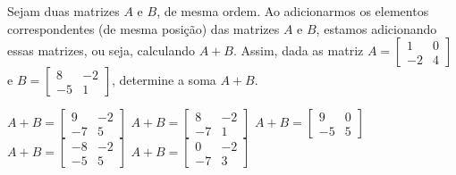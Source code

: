 Sejam duas matrizes $A$ e $B$, de mesma ordem. Ao adicionarmos os elementos correspondentes (de mesma posição) das matrizes $A$ e $B$, estamos adicionando essas matrizes, ou seja, calculando $A+B$. Assim, dada as matriz $A = \left[ \begin{array}{cc}
1 & 0 \\
-2 & 4
\end{array} \right]$ e $B = \left[ \begin{array}{cc}
8 & -2 \\
-5 & 1
\end{array} \right]$, determine a soma $A+B$.

$A+B = \left[ \begin{array}{cc} 9 & -2 \\ -7 & 5 \end{array} \right]$
$A+B = \left[ \begin{array}{cc} 8 & -2 \\ -7 & 1 \end{array} \right]$
$A+B = \left[ \begin{array}{cc} 9 & 0 \\ -5 & 5 \end{array} \right]$
$A+B = \left[ \begin{array}{cc} -8 & -2 \\ -5 & 5 \end{array} \right]$
$A+B = \left[ \begin{array}{cc} 0 & -2 \\ -7 & 3 \end{array} \right]$


